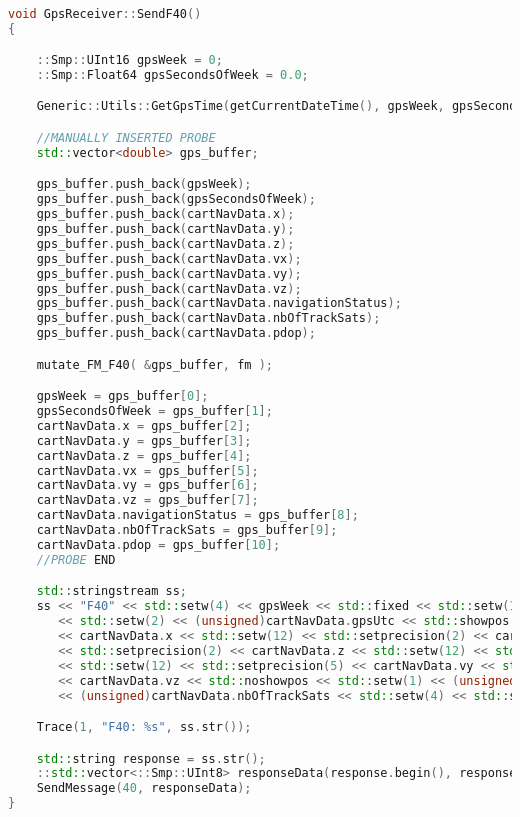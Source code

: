 \begin{lstlisting}[language=C++, caption=Probe insertion Strategy, label={lst:probe_insertion}]

void GpsReceiver::SendF40()
{

    ::Smp::UInt16 gpsWeek = 0;
    ::Smp::Float64 gpsSecondsOfWeek = 0.0;

    Generic::Utils::GetGpsTime(getCurrentDateTime(), gpsWeek, gpsSecondsOfWeek);

    //MANUALLY INSERTED PROBE
    std::vector<double> gps_buffer;

    gps_buffer.push_back(gpsWeek);
    gps_buffer.push_back(gpsSecondsOfWeek);
    gps_buffer.push_back(cartNavData.x);
    gps_buffer.push_back(cartNavData.y);
    gps_buffer.push_back(cartNavData.z);
    gps_buffer.push_back(cartNavData.vx);
    gps_buffer.push_back(cartNavData.vy);
    gps_buffer.push_back(cartNavData.vz);
    gps_buffer.push_back(cartNavData.navigationStatus);
    gps_buffer.push_back(cartNavData.nbOfTrackSats);
    gps_buffer.push_back(cartNavData.pdop);

    mutate_FM_F40( &gps_buffer, fm );

    gpsWeek = gps_buffer[0];
    gpsSecondsOfWeek = gps_buffer[1];
    cartNavData.x = gps_buffer[2];
    cartNavData.y = gps_buffer[3];
    cartNavData.z = gps_buffer[4];
    cartNavData.vx = gps_buffer[5];
    cartNavData.vy = gps_buffer[6];
    cartNavData.vz = gps_buffer[7];
    cartNavData.navigationStatus = gps_buffer[8];
    cartNavData.nbOfTrackSats = gps_buffer[9];
    cartNavData.pdop = gps_buffer[10];
    //PROBE END

    std::stringstream ss;
    ss << "F40" << std::setw(4) << gpsWeek << std::fixed << std::setw(12) << std::setprecision(5) << gpsSecondsOfWeek
       << std::setw(2) << (unsigned)cartNavData.gpsUtc << std::showpos << std::setw(12) << std::setprecision(2)
       << cartNavData.x << std::setw(12) << std::setprecision(2) << cartNavData.y << std::setw(12)
       << std::setprecision(2) << cartNavData.z << std::setw(12) << std::setprecision(5) << cartNavData.vx
       << std::setw(12) << std::setprecision(5) << cartNavData.vy << std::setw(12) << std::setprecision(5)
       << cartNavData.vz << std::noshowpos << std::setw(1) << (unsigned)cartNavData.navigationStatus << std::setw(2)
       << (unsigned)cartNavData.nbOfTrackSats << std::setw(4) << std::setprecision(1) << cartNavData.pdop;

    Trace(1, "F40: %s", ss.str());

    std::string response = ss.str();
    ::std::vector<::Smp::UInt8> responseData(response.begin(), response.end());
    SendMessage(40, responseData);
}

\end{lstlisting}

